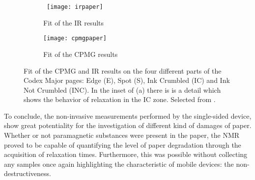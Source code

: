\documentclass[a4paper,11pt]{report}
\begin{document}
\begin{figure}[h]
\centering
\begin{subfigure}{0.6\textwidth}
\
\texttt{[image: irpaper]} 
\caption{Fit of the IR results}
\end{subfigure}
\begin{subfigure}{0.6\textwidth}
\texttt{[image: cpmgpaper]}
\caption{Fit of the CPMG results}
\end{subfigure}
\caption{Fit of the CPMG and IR results on the four different parts of the Codex Major pages: Edge (E), Spot (S), Ink Crumbled (IC) and Ink Not Crumbled (INC). In the inset of (a) there is is a detail which shows the behavior of relaxation in the IC zone. Selected from \cite{duepaper}.}\label{paper2}
\end{figure}

To conclude, the non-invasive measurements performed by the single-sided device, show great potentiality for the investigation of different kind of damages of paper. Whether or not paramagnetic substances were present in the paper, the NMR proved to be capable of quantifying the level of paper degradation through the acquisition of relaxation times. Furthermore, this was possible without collecting any samples once again highlighting the characteristic of mobile devices: the non-destructiveness.
\clearpage
\end{document}
